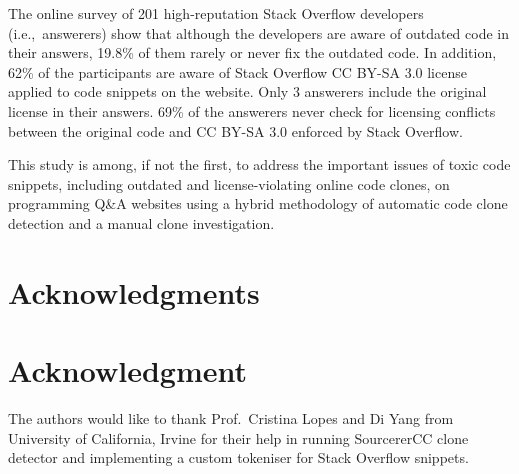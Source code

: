 \documentclass[10pt,journal,compsoc]{IEEEtran}
\begin{document}
The online survey of 201 high-reputation Stack Overflow developers (i.e.,~answerers)
show that although the developers are aware of outdated code in their answers,
19.8\% of them rarely or never fix the outdated code. In addition, 62\% of the participants
are aware of Stack Overflow CC BY-SA 3.0 license applied to code snippets on the website.
Only 3 answerers include the original license in their answers. 69\% of the answerers
never check for licensing conflicts between the original code and CC BY-SA 3.0 
enforced by Stack Overflow.

This study is among, if not the first, to address the important issues of toxic
code snippets, including outdated and license-violating online code clones, on
programming Q\&A websites using a hybrid methodology of automatic code clone
detection and a manual clone investigation.


\ifCLASSOPTIONcompsoc
  \section*{Acknowledgments}
\else
  \section*{Acknowledgment}
\fi


The authors would like to thank Prof.~Cristina Lopes and Di Yang
from University of California, Irvine
for their help in running SourcererCC clone detector and implementing
a custom tokeniser for Stack Overflow snippets.



  

% 
\end{document}
